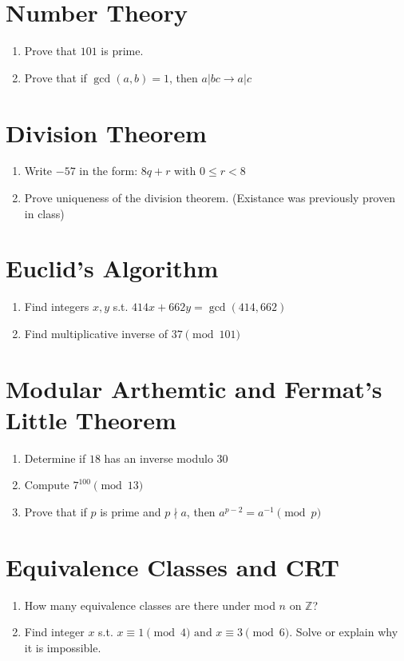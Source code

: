 \documentclass[12pt]{article}
\newcommand{\Z}{\mathbb{Z}}
\newcommand{\tand}{\text{ and }}
\begin{document}
\section*{Number Theory}
\begin{enumerate}
  \item Prove that $101$ is prime.
  \item Prove that if $\gcd(a, b) = 1$, then $a|bc \rightarrow a|c$
\end{enumerate}

\section*{Division Theorem}
\begin{enumerate}
  \item Write $-57$ in the form: $8q + r$ with $0 \leq r < 8$
  \item Prove uniqueness of the division theorem. (Existance was previously proven in class)
\end{enumerate}

\section*{Euclid's Algorithm}
\begin{enumerate}
  \item Find integers $x, y$ s.t. $414x + 662y = \gcd(414,662)$
  \item Find multiplicative inverse of $37 \pmod{101}$
\end{enumerate}

\section*{Modular Arthemtic and Fermat's Little Theorem}
\begin{enumerate}
  \item Determine if $18$ has an inverse modulo $30$
  \item Compute $7^{100} \pmod{13}$
  \item Prove that if $p$ is prime and $p \nmid a$, then $a^{p-2} = a^{-1} \pmod{p}$
\end{enumerate}

\section*{Equivalence Classes and CRT}
\begin{enumerate}
  \item How many equivalence classes are there under mod $n$ on $\Z$?
  \item Find integer $x$ s.t. $x \equiv 1 \pmod{4} \tand x \equiv 3 \pmod{6}$. Solve or explain why it is impossible.

\end{enumerate}
\end{document}
